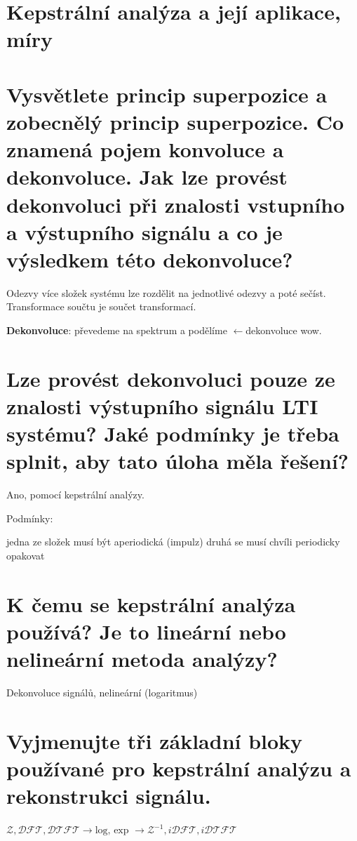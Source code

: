 \documentclass[a4paper,12pt]{article}   %
\newcommand{\llarr}{$\leftarrow$}
\newcommand{\mt}[1]{$#1$}
\begin{document}
\clearpage

\section*{Kepstrální analýza a její aplikace, míry}
\section{Vysvětlete princip superpozice a zobecnělý princip superpozice. Co znamená pojem konvoluce a dekonvoluce. Jak lze provést dekonvoluci při znalosti vstupního a výstupního signálu a co je výsledkem této dekonvoluce?}
Odezvy více složek systému lze rozdělit na jednotlivé odezvy a poté sečíst. Transformace součtu je součet transformací. 

\textbf{Dekonvoluce}: převedeme na spektrum a podělíme \llarr dekonvoluce wow. 


\section{Lze provést dekonvoluci pouze ze znalosti výstupního signálu LTI systému? Jaké podmínky je třeba splnit, aby tato úloha měla řešení?}

Ano, pomocí kepstrální analýzy.

Podmínky:
\begin{outline}
        \1 jedna ze složek musí být aperiodická (impulz)
        \1 druhá se musí chvíli periodicky opakovat
\end{outline}


\section{K čemu se kepstrální analýza používá? Je to lineární nebo nelineární metoda analýzy?}

Dekonvoluce signálů, nelineární (logaritmus)


\section{Vyjmenujte tři základní bloky používané pro kepstrální analýzu a rekonstrukci signálu.}

\mt{\mathscr{Z}, \mathscr{DFT}, \mathscr{DTFT} \rightarrow \text{log, exp }\rightarrow \mathscr{Z}^{-1}, i\mathscr{DFT}, i\mathscr{DTFT}}
\end{document}
